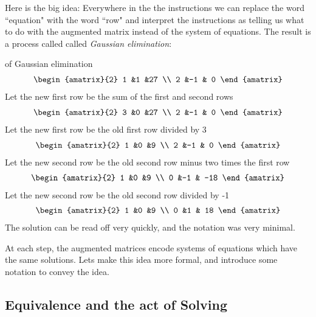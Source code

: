 Here is the big idea: 
Everywhere in the the instructions we can replace the word ``equation" with the word ``row" and interpret the instructions as telling us what to do with the augmented matrix instead of the system of equations.
The result is a process called called {\it Gaussian elimination}: 

\begin{example} of Gaussian elimination
\begin{eqnarray*}
 \begin{amatrix}{2}
1 &1 &27 \\ 2 &-1 & 0
\end{amatrix}
  \end{eqnarray*}
Let the new first row be the sum of the first and second rows
\begin{eqnarray*}
 \begin{amatrix}{2}
3 &0 &27 \\ 2 &-1 & 0
\end{amatrix}
  \end{eqnarray*}
Let the new first row be the old first row divided by 3
 \begin{eqnarray*}
 \begin{amatrix}{2}
1 &0 &9 \\ 2 &-1 & 0
\end{amatrix}
  \end{eqnarray*}
Let the new second row be the old second row minus two times the first row 
\begin{eqnarray*}
 \begin{amatrix}{2}
1 &0 &9 \\ 0 &-1 & -18
\end{amatrix}
  \end{eqnarray*}
Let the new  second row be the old second row divided by -1
\begin{eqnarray*}
 \begin{amatrix}{2}
1 &0 &9 \\ 0 &1 & 18
\end{amatrix}
  \end{eqnarray*}
The solution can be read off very quickly, and the notation was very minimal. 
\end{example}
 At each step, the augmented matrices encode systems of equations which have the same solutions. Lets make this idea more formal, and introduce some notation to convey the idea.

\subsection{Equivalence and the act of Solving}


